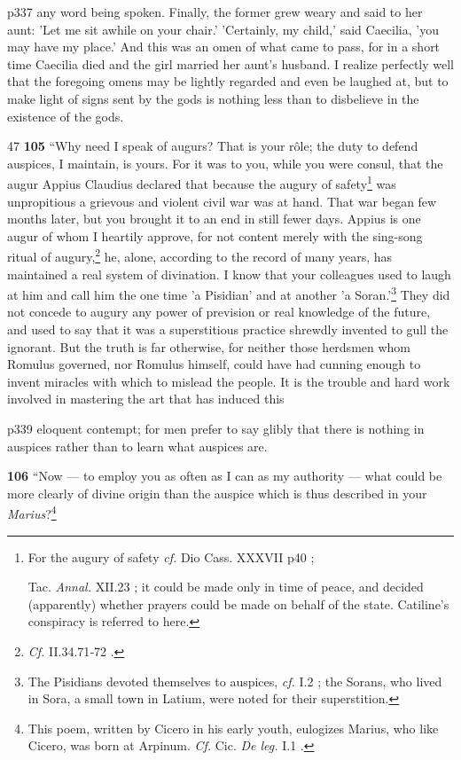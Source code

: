 p337 any word being spoken. Finally, the former grew weary and said to her aunt: 'Let me sit awhile on your chair.' 'Certainly, my child,' said Caecilia, 'you may have my place.' And this was an omen of what came to pass, for in a short time Caecilia died and the girl married her aunt's husband. I realize perfectly well that the foregoing omens may be lightly regarded and even be laughed at, but to make light of signs sent by the gods is nothing less than to disbelieve in the existence of the gods.

47
\textbf{105} ``Why need I speak of augurs? That is your rôle; the duty to defend auspices, I maintain, is yours. For it was to you, while you were consul, that the augur Appius Claudius declared that because the augury of safety\texthebrew{}\footnote{For the augury of safety \emph{cf.}
Dio Cass. XXXVII p40 ;

Tac. \emph{Annal.} XII.23 ; it could be made only in time of peace, and decided (apparently) whether prayers could be made on behalf of the state. Catiline's conspiracy is referred to here.

} was unpropitious a grievous and violent civil war was at hand. That war began few months later, but you brought it to an end in still fewer days. Appius is one augur of whom I heartily approve, for not content merely with the sing-song ritual of augury,\texthebrew{}\footnote{\emph{Cf.}
II.34.71\texthebrew{‑}72 .

} he, alone, according to the record of many years, has maintained a real system of divination. I know that your colleagues used to laugh at him and call him the one time 'a Pisidian' and at another 'a Soran.'\texthebrew{}\footnote{The Pisidians devoted themselves to auspices, \emph{cf.} I.2 ; the Sorans, who lived in Sora, a small town in Latium, were noted for their superstition.

} They did not concede to augury any power of prevision or real knowledge of the future, and used to say that it was a superstitious practice shrewdly invented to gull the ignorant. But the truth is far otherwise, for neither those herdsmen whom Romulus governed, nor Romulus himself, could have had cunning enough to invent miracles with which to mislead the people. It is the trouble and hard work involved in mastering the art that has induced this

p339 eloquent contempt; for men prefer to say glibly that there is nothing in auspices rather than to learn what auspices are.

\textbf{106} ``Now \texthebrew{—} to employ you as often as I can as my authority \texthebrew{—} what could be more clearly of divine origin than the auspice which is thus described in your \emph{Marius}?\footnote{This poem, written by Cicero in his early youth, eulogizes Marius, who like Cicero, was born at Arpinum. \emph{Cf.} Cic. \emph{De leg.} I.1 .

}

